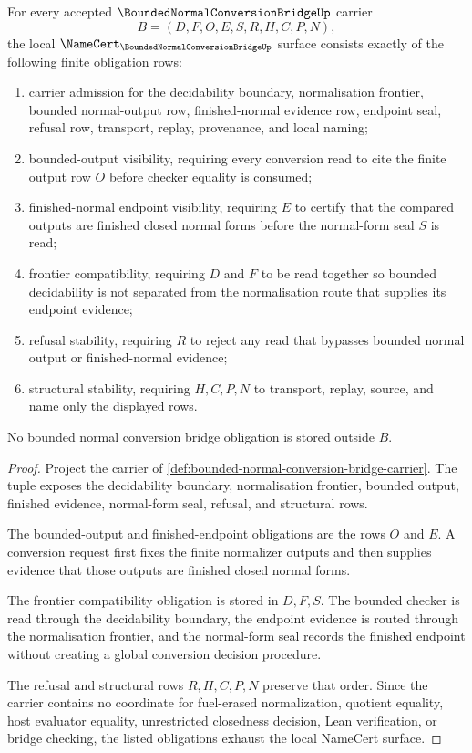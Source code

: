 \begin{theorem}
\label{thm:bounded-normal-conversion-bridge-namecert-obligations}
For every accepted $\BoundedNormalConversionBridgeUp$ carrier
$$
B=(D,F,O,E,S,R,H,C,P,N),
$$
the local $\NameCert_{\BoundedNormalConversionBridgeUp}$ surface consists exactly of the following finite obligation rows:
\begin{enumerate}
\item carrier admission for the decidability boundary, normalisation frontier, bounded normal-output row, finished-normal evidence row, endpoint seal, refusal row, transport, replay, provenance, and local naming;
\item bounded-output visibility, requiring every conversion read to cite the finite output row $O$ before checker equality is consumed;
\item finished-normal endpoint visibility, requiring $E$ to certify that the compared outputs are finished closed normal forms before the normal-form seal $S$ is read;
\item frontier compatibility, requiring $D$ and $F$ to be read together so bounded decidability is not separated from the normalisation route that supplies its endpoint evidence;
\item refusal stability, requiring $R$ to reject any read that bypasses bounded normal output or finished-normal evidence;
\item structural stability, requiring $H,C,P,N$ to transport, replay, source, and name only the displayed rows.
\end{enumerate}
No bounded normal conversion bridge obligation is stored outside $B$.
\end{theorem}
\begin{proof}
Project the carrier of \autoref{def:bounded-normal-conversion-bridge-carrier}. The tuple exposes the decidability boundary, normalisation frontier, bounded output, finished evidence, normal-form seal, refusal, and structural rows.

The bounded-output and finished-endpoint obligations are the rows $O$ and $E$. A conversion request first fixes the finite normalizer outputs and then supplies evidence that those outputs are finished closed normal forms.

The frontier compatibility obligation is stored in $D,F,S$. The bounded checker is read through the decidability boundary, the endpoint evidence is routed through the normalisation frontier, and the normal-form seal records the finished endpoint without creating a global conversion decision procedure.

The refusal and structural rows $R,H,C,P,N$ preserve that order. Since the carrier contains no coordinate for fuel-erased normalization, quotient equality, host evaluator equality, unrestricted closedness decision, Lean verification, or bridge checking, the listed obligations exhaust the local NameCert surface.
\end{proof}


